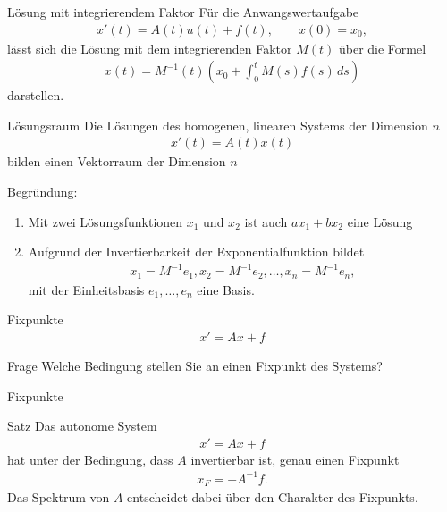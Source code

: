 \begin{frame}
  \begin{block}{Lösung mit integrierendem Faktor}
    Für die Anwangswertaufgabe
    \begin{gather*}
      x'(t) = A(t)u(t)+ f(t),
      \qquad
      x(0) = x_0,
    \end{gather*}
    lässt sich die Lösung mit dem integrierenden Faktor $M(t)$ über die Formel
    \begin{gather*}
      x(t) = M^{-1}(t)
      \left(
        x_0 + \int_0^t M(s) f(s) \,ds
      \right)
    \end{gather*}
    darstellen.
  \end{block}
\end{frame}

\begin{frame}
  \begin{block}{Lösungsraum}
    Die Lösungen des homogenen, linearen Systems der Dimension $n$
    \begin{gather*}
      x'(t) = A(t)x(t)
    \end{gather*}
    bilden einen Vektorraum der Dimension $n$
  \end{block}
  \pause
  Begründung:
  \begin{enumerate}
  \item Mit zwei Lösungsfunktionen $x_1$ und $x_2$ ist auch
    $ax_1+bx_2$ eine Lösung
  \item Aufgrund der Invertierbarkeit der Exponentialfunktion bildet
    \begin{gather*}
      x_1 = M^{-1} e_1, x_2 = M^{-1} e_2,\dots, x_n = M^{-1} e_n,
    \end{gather*}
    mit der Einheitsbasis $e_1,\dots,e_n$ eine Basis.
  \end{enumerate}
\end{frame}

\begin{frame}{Fixpunkte}
  \begin{gather*}
    x' = Ax+f
  \end{gather*}
  \begin{exampleblock}{Frage}
    Welche Bedingung stellen Sie an einen Fixpunkt des Systems?
  \end{exampleblock}
\end{frame}


\begin{frame}{Fixpunkte}
  \begin{block}{Satz}
  Das autonome System
  \begin{gather*}
    x' = Ax+f
  \end{gather*}
  hat unter der Bedingung, dass $A$ invertierbar ist, genau einen Fixpunkt
  \begin{gather*}
    x_F = -A^{-1}f.
  \end{gather*}
  Das Spektrum von $A$ entscheidet dabei über den Charakter des Fixpunkts.    
  \end{block}
\end{frame}


